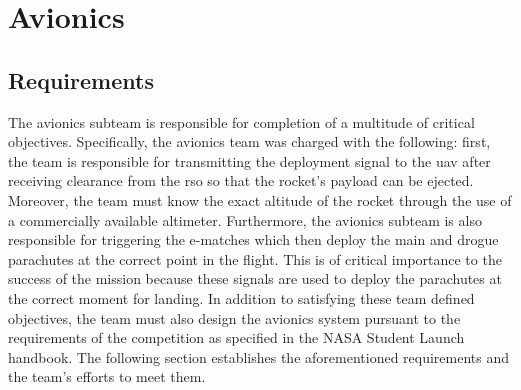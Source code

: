 
\chapter{Avionics}
\section{Requirements}
The avionics subteam is responsible for completion of a multitude of critical objectives. Specifically, the avionics team was charged with the following: first, the team is responsible for transmitting the deployment signal to the \gls{uav} after receiving clearance from the \gls{rso} so that the rocket’s payload can be ejected. Moreover, the team must know the exact altitude of the rocket through the use of a commercially available altimeter.
Furthermore, the avionics subteam is also responsible for triggering the e-matches which then deploy the main and drogue parachutes
at the correct point in the flight. This is of critical importance to the success of the mission because these signals are used to deploy the parachutes at the correct moment for landing.
In addition to satisfying these team defined objectives, the team must also design the avionics system pursuant to the requirements of the competition as specified in the NASA Student Launch handbook. The following section establishes the aforementioned requirements and the team’s efforts to meet them. 

